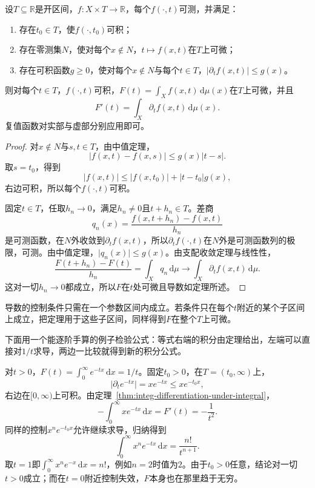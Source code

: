 \begin{theorem}[积分号下求导]
\label{thm:integ-differentiation-under-integral}
设$T\subseteq\mathbb R$是开区间，$f:X\times T\to\mathbb R$，每个$f(\cdot,t)$可测，并满足：
\begin{enumerate}
 \item 存在$t_0\in T$，使$f(\cdot,t_0)$可积；
 \item 存在零测集$N$，使对每个$x\notin N$，$t\mapsto f(x,t)$在$T$上可微；
 \item 存在可积函数$g\geq0$，使对每个$x\notin N$与每个$t\in T$，$\lvert\partial_tf(x,t)\rvert\leq g(x)$。
\end{enumerate}
则对每个$t\in T$，$f(\cdot,t)$可积，$F(t)=\int_Xf(x,t)\,\mathrm d\mu(x)$在$T$上可微，并且
\begin{equation}
 F'(t)=\int_X\partial_tf(x,t)\,\mathrm d\mu(x).
 \label{eq:integ-differentiation-under-integral}
\end{equation}
复值函数对实部与虚部分别应用即可。
\end{theorem}

\begin{proof}
对$x\notin N$与$s,t\in T$，由中值定理，
\[
 \lvert f(x,t)-f(x,s)\rvert\leq g(x)\lvert t-s\rvert .
\]
取$s=t_0$，得到
\[
 \lvert f(x,t)\rvert\leq\lvert f(x,t_0)\rvert+\lvert t-t_0\rvert g(x),
\]
右边可积，所以每个$f(\cdot,t)$可积。

固定$t\in T$，任取$h_n\to0$，满足$h_n\neq0$且$t+h_n\in T$。差商
\[
 q_n(x)=\frac{f(x,t+h_n)-f(x,t)}{h_n}
\]
是可测函数，在$N$外收敛到$\partial_tf(x,t)$，所以$\partial_tf(\cdot,t)$在$N$外是可测函数列的极限，可测。由中值定理，$\lvert q_n(x)\rvert\leq g(x)$。由支配收敛定理与线性性，
\[
 \frac{F(t+h_n)-F(t)}{h_n}=\int_Xq_n\,\mathrm d\mu\to\int_X\partial_tf(x,t)\,\mathrm d\mu .
\]
这对一切$h_n\to0$都成立，所以$F$在$t$处可微且导数如定理所述。
\end{proof}

导数的控制条件只需在一个参数区间内成立。若条件只在每个$t$附近的某个子区间上成立，把定理用于这些子区间，同样得到$F$在整个$T$上可微。

下面用一个能逐阶手算的例子检验公式：等式右端的积分由定理给出，左端可以直接对$1/t$求导，两边一比较就得到新的积分公式。

\begin{example}[逐阶求导]
\label{ex:integ-gamma-derivatives}
对$t>0$，$F(t)=\int_0^\infty e^{-tx}\,\mathrm dx=1/t$。固定$t_0>0$，在$T=(t_0,\infty)$上，
\[
 \lvert\partial_te^{-tx}\rvert=xe^{-tx}\leq xe^{-t_0x},
\]
右边在$[0,\infty)$上可积。由定理~\ref{thm:integ-differentiation-under-integral}，
\[
 -\int_0^\infty xe^{-tx}\,\mathrm dx=F'(t)=-\frac1{t^2}.
\]
同样的控制$x^ne^{-t_0x}$允许继续求导，归纳得到
\[
 \int_0^\infty x^ne^{-tx}\,\mathrm dx=\frac{n!}{t^{n+1}}.
\]
取$t=1$即$\int_0^\infty x^ne^{-x}\,\mathrm dx=n!$，例如$n=2$时值为$2$。由于$t_0>0$任意，结论对一切$t>0$成立；而在$t=0$附近控制失效，$F$本身也在那里趋于无穷。
\end{example}

